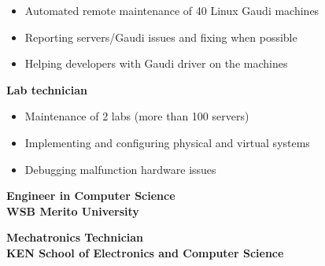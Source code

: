 \documentclass[10pt,a4paper,ragged2e,withhyper]{altacv/altacv}
\begin{document}
\begin{paracol}{2}
\begin{itemize}
\item Automated remote maintenance of 40 Linux Gaudi machines
\item Reporting servers/Gaudi issues and fixing when possible
\item Helping developers with Gaudi driver on the machines
\end{itemize}

\medskip

\textbf{\textcolor{accent}{Lab technician}} \hfill {}
\smallskip

\begin{itemize}
\item Maintenance of 2 labs (more than 100 servers)
\item Implementing and configuring physical and virtual systems
\item Debugging malfunction hardware issues
\end{itemize}





\medskip


\large\textbf{Engineer in Computer Science} \normalsize \hfill {}\\
\textbf{\textcolor{accent}{WSB Merito University}} \hfill {}\\

\divider

\large\textbf{Mechatronics Technician} \normalsize \hfill {}\\
\textbf{\textcolor{accent}{KEN School of Electronics and Computer Science}} \hfill {}\\




\end{paracol}
\end{document}
